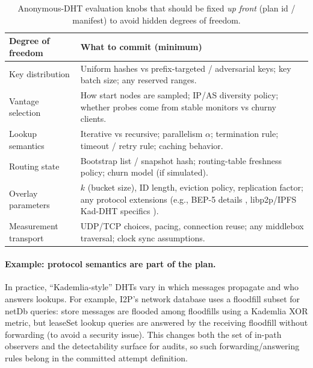 \documentclass[11pt]{article}
\begin{document}
\begin{table}[t]
\centering
\begin{tabularx}{\linewidth}{@{}lX@{}}
\toprule
Degree of freedom & What to commit (minimum) \\
\midrule
Key distribution & Uniform hashes vs prefix-targeted / adversarial keys; key batch size; any reserved ranges. \\
Vantage selection & How start nodes are sampled; IP/AS diversity policy; whether probes come from stable monitors vs churny clients. \\
Lookup semantics & Iterative vs recursive; parallelism $\alpha$; termination rule; timeout / retry rule; caching behavior. \\
Routing state & Bootstrap list / snapshot hash; routing-table freshness policy; churn model (if simulated). \\
Overlay parameters & $k$ (bucket size), ID length, eviction policy, replication factor; any protocol extensions (e.g., BEP-5 details \cite{bep5_mainline_dht}, libp2p/IPFS Kad-DHT specifics \cite{libp2p_kad_dht_spec,ipfs_kad_dht_spec}). \\
Measurement transport & UDP/TCP choices, pacing, connection reuse; any middlebox traversal; clock sync assumptions. \\
\bottomrule
\end{tabularx}
\caption{Anonymous-DHT evaluation knobs that should be fixed \emph{up front} (plan id / manifest) to avoid hidden degrees of freedom.}
\label{tab:dht_degrees_freedom}
\end{table}

\paragraph{Example: protocol semantics are part of the plan.}
In practice, ``Kademlia-style'' DHTs vary in which messages propagate and who answers lookups.
For example, I2P's network database uses a floodfill subset for netDb queries: store messages are flooded among floodfills using a Kademlia XOR metric, but leaseSet lookup queries are answered by the receiving floodfill without forwarding (to avoid a security issue).
This changes both the set of in-path observers and the detectability surface for audits, so such forwarding/answering rules belong in the committed attempt definition.\cite{i2p_tech_intro}
\end{document}
